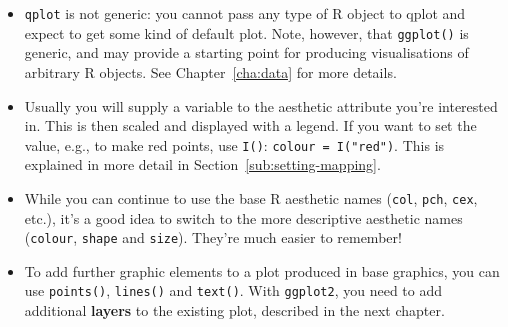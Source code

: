 \begin{itemize}
  \item {\tt qplot} is not generic: you cannot pass any type of R object to qplot and expect to get some kind of default plot.  Note, however, that {\tt ggplot()} is generic, and may provide a starting point for producing visualisations of arbitrary R objects.  See Chapter~\ref{cha:data} for more details.
  
  \item Usually you will supply a variable to the aesthetic attribute you're interested in.  This is then scaled and displayed with a legend.  If you want to set the value, e.g., to make red points, use {\tt I()}: {\tt colour = I("red")}.  This is explained in more detail in Section~\ref{sub:setting-mapping}.
  
  \item While you can continue to use the base R aesthetic names ({\tt col},  {\tt pch}, {\tt cex}, etc.), it's a good idea to switch to the more descriptive \ggplot aesthetic names ({\tt colour}, {\tt shape} and {\tt size}).  They're much easier to remember!

  \item To add further graphic elements to a plot produced in base graphics, you can use {\tt points()}, {\tt lines()} and {\tt text()}.  With {\tt ggplot2}, you need to add additional {\bf layers} to the existing plot, described in the next chapter.
  
\end{itemize}


